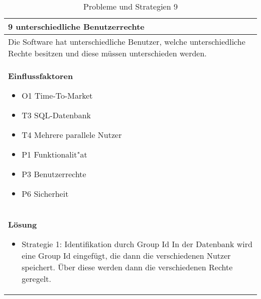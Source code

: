 \begin{table}[H]
\caption{Probleme und Strategien 9}
\begin{tabular}{|p{\textwidth}|}\hline
9 unterschiedliche Benutzerrechte\\ \hline
Die Software hat unterschiedliche Benutzer, welche unterschiedliche Rechte besitzen und diese müssen unterschieden werden.\\ \hline
\textbf{Einflussfaktoren}
\begin{itemize}
\item O1 Time-To-Market
\item T3 SQL-Datenbank
\item T4 Mehrere parallele Nutzer
\item P1 Funktionalit"at
\item P3 Benutzerrechte
\item P6 Sicherheit
\end{itemize}\\ \hline
\textbf{Lösung}
\begin{itemize}
\item Strategie 1: Identifikation durch Group Id \leavevmode\newline
In der Datenbank wird eine Group Id eingefügt, die dann die verschiedenen Nutzer speichert. Über diese werden dann die verschiedenen Rechte geregelt.
\end{itemize} \\ \hline
\end{tabular}
\end{table}